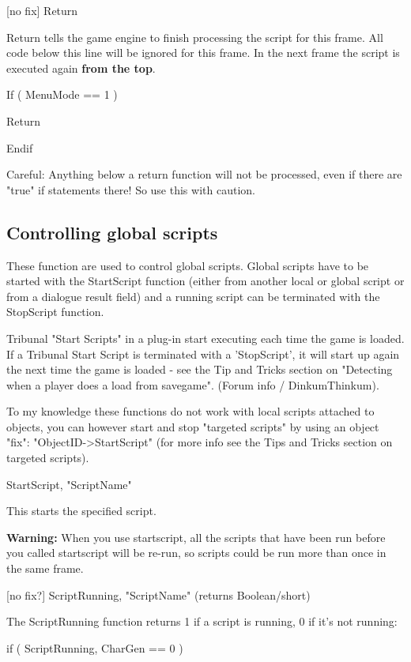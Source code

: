 \documentclass[
]{article}
\begin{document}
{[}no fix{]} Return

Return tells the game engine to finish processing the script for this
frame. All code below this line will be ignored for this frame. In the
next frame the script is executed again \textbf{from the top}.

If ( MenuMode == 1 )

Return

Endif

Careful: Anything below a return function will not be processed, even if
there are "true" if statements there! So use this with caution.

\hypertarget{controlling-global-scripts}{%
\subsection{Controlling global
scripts}\label{controlling-global-scripts}}

These function are used to control global scripts. Global scripts have
to be started with the StartScript function (either from another local
or global script or from a dialogue result field) and a running script
can be terminated with the StopScript function.

Tribunal "Start Scripts" in a plug-in start executing each time the game
is loaded. If a Tribunal Start Script is terminated with a 'StopScript',
it will start up again the next time the game is loaded - see the Tip
and Tricks section on "Detecting when a player does a load from
savegame". (Forum info / DinkumThinkum).

To my knowledge these functions do not work with local scripts attached
to objects, you can however start and stop "targeted scripts" by using
an object "fix": "ObjectID-\textgreater StartScript" (for more info see
the Tips and Tricks section on targeted scripts).

StartScript, "ScriptName"

This starts the specified script.

\textbf{Warning:} When you use startscript, all the scripts that have
been run before you called startscript will be re-run, so scripts could
be run more than once in the same frame.

{[}no fix?{]} ScriptRunning, "ScriptName" (returns Boolean/short)

The ScriptRunning function returns 1 if a script is running, 0 if it's
not running:

if ( ScriptRunning, CharGen == 0 )
\end{document}
